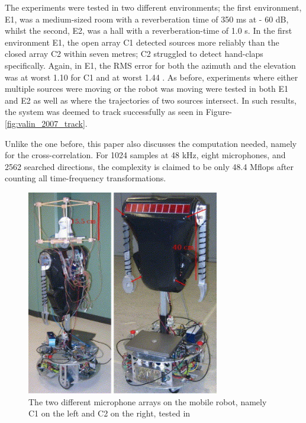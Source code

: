 \documentclass[notitlepage]{report}
\begin{document}
The experiments were tested in two different environments; the first environment, E1, was a medium-sized room with a reverberation time of 350 \si{ms} at - 60 \si{dB}, whilst the second, E2, was a hall with a reverberation-time of 1.0 \si{s}. In the first environment E1, the open array C1 detected sources more reliably than the closed array C2 within seven metres; C2 struggled to detect hand-claps specifically. Again, in E1, the RMS error for both the azimuth and the elevation was at worst 1.10 \si{\deg} for C1 and at worst 1.44 \si{\deg}. As before, experiments where either multiple sources were moving or the robot was moving were tested in both E1 and E2 as well as where the trajectories of two sources intersect. In such results, the system was deemed to track successfully as seen in Figure-\ref{fig:valin_2007_track}. 

Unlike the one before, this paper also discusses the computation needed, namely for the cross-correlation. For 1024 samples at 48 \si{kHz}, eight microphones, and 2562 searched directions, the complexity is claimed to be only 48.4 \si{Mflops} after counting all time-frequency transformations.

\begin{figure}[H]
\includegraphics[width=0.75\textwidth]{./valin_2007/array.jpg}
\centering
\caption{The two different microphone arrays on the mobile robot, namely C1 on the left and C2 on the right, tested in \cite{valin_robust_2007}}
\label{fig:valin_2007_array}
\centering
\end{figure}
\end{document}
